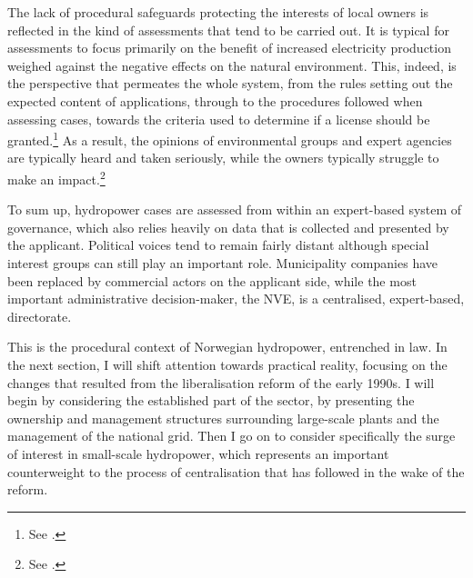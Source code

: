 The lack of procedural safeguards protecting the interests of local owners is reflected in the kind of assessments that tend to be carried out. It is typical for assessments to focus primarily on the benefit of increased electricity production weighed against the negative effects on the natural environment. This, indeed, is the perspective that permeates the whole system, from the rules setting out the expected content of applications, through to the procedures followed when assessing cases, towards the criteria used to determine if a license should be granted.\footnote{See \cite{stokker10}.} As a result, the opinions of environmental groups and expert agencies are typically heard and taken seriously, while the owners typically struggle to make an impact.\footnote{See \cite{jorpeland11}.}

To sum up, hydropower cases are assessed from within an expert-based system of governance, which also relies heavily on data that is collected and presented by the applicant. Political voices tend to remain fairly distant although special interest groups can still play an important role. Municipality companies have been replaced by commercial actors on the applicant side, while the most important administrative decision-maker, the NVE, is a centralised, expert-based, directorate.

This is the procedural context of Norwegian hydropower, entrenched in law. In the next section, I will shift attention towards practical reality, focusing on the changes that resulted from the liberalisation reform of the early 1990s. I will begin by considering the established part of the sector, by presenting the ownership and management structures surrounding large-scale plants and the management of the national grid. Then I go on to consider specifically the surge of interest in small-scale hydropower, which represents an important counterweight to the process of centralisation  that has followed in the wake of the reform.

%
%
%
%
%
%

